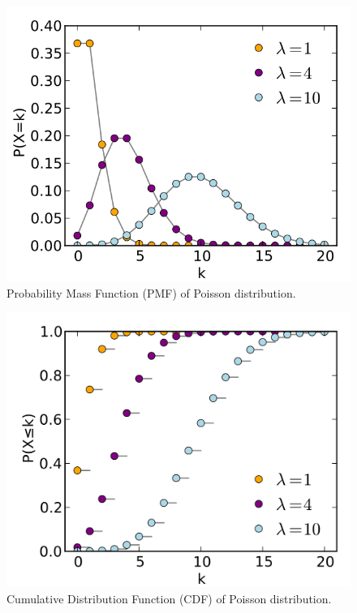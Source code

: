 \begin{figure}[h!]
\begin{center}
	\includegraphics[scale=0.25]{poisson_pmf.png}
	\caption[]{Probability Mass Function (PMF) of Poisson distribution.}
	\label{fairdiepmf}
	\end{center}
	\end{figure}
	
\begin{figure}[h!]
\begin{center}
	\includegraphics[scale=0.07]{poisson_cdf.png}
	\caption[]{Cumulative Distribution Function (CDF) of Poisson distribution.}
	\label{fairdiepmf}
	\end{center}
	\end{figure}
	
